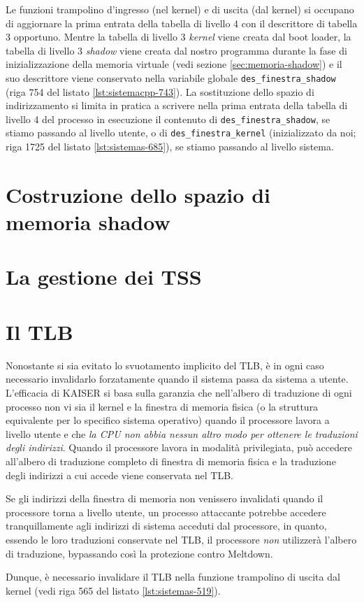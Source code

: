 Le funzioni trampolino d'ingresso (nel kernel) e di uscita (dal kernel) si occupano di aggiornare la prima entrata della tabella di livello 4 con il descrittore di tabella 3 opportuno.
Mentre la tabella di livello 3 \emph{kernel} viene creata dal boot loader, la tabella di livello 3 \emph{shadow} viene creata dal nostro programma durante la fase di inizializzazione della memoria virtuale (vedi sezione \vref{sec:memoria-shadow}) e il suo descrittore viene conservato nella variabile globale \texttt{des\_finestra\_shadow} (riga 754 del listato \ref{lst:sistemacpp-743}).
La sostituzione dello spazio di indirizzamento si limita in pratica a scrivere nella prima entrata della tabella di livello 4 del processo in esecuzione il contenuto di \texttt{des\_finestra\_shadow}, se stiamo passando al livello utente, o di \texttt{des\_finestra\_kernel} (inizializzato da noi; riga 1725 del listato \ref{lst:sistemas-685}), se stiamo passando al livello sistema.

\section{Costruzione dello spazio di memoria shadow}
\label{sec:memoria-shadow}

\section{La gestione dei TSS}

\section{Il TLB}
Nonostante si sia evitato lo svuotamento implicito del TLB, è in ogni caso necessario invalidarlo forzatamente quando il sistema passa da sistema a utente. 
L'efficacia di KAISER si basa sulla garanzia che nell'albero di traduzione di ogni processo non vi sia il kernel e la finestra di memoria fisica (o la struttura equivalente per lo specifico sistema operativo) quando il processore lavora a livello utente e che \emph{la CPU non abbia nessun altro modo per ottenere le traduzioni degli indirizzi}.
Quando il processore lavora in modalità privilegiata, può accedere all'albero di traduzione completo di finestra di memoria fisica e la traduzione degli indirizzi a cui accede viene conservata nel TLB.

Se gli indirizzi della finestra di memoria non venissero invalidati quando il processore torna a livello utente, un processo attaccante potrebbe accedere tranquillamente agli indirizzi di sistema acceduti dal processore, in quanto, essendo le loro traduzioni conservate nel TLB, il processore \emph{non} utilizzerà l'albero di traduzione, bypassando così la protezione contro Meltdown.

Dunque, è necessario invalidare il TLB nella funzione trampolino di uscita dal kernel (vedi riga 565 del listato \vref{lst:sistemas-519}).